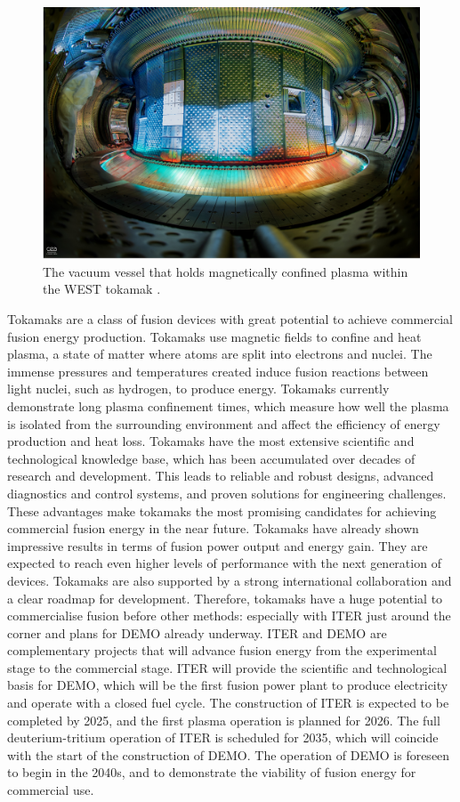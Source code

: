 \begin{figure}[H]
    \centering
    \includegraphics[width=\textwidth]{images/Final/vaccumeVessel.png}
    \caption{The vacuum vessel that holds magnetically confined plasma within the WEST tokamak \cite{vacves}.}
    \label{fig:vacves}
  \end{figure}

Tokamaks are a class of fusion devices with great potential to achieve commercial fusion energy production. Tokamaks use magnetic fields to confine and heat plasma, a state of matter where atoms are split into electrons and nuclei. The immense pressures and temperatures created induce fusion reactions between light nuclei, such as hydrogen, to produce energy. Tokamaks currently demonstrate long plasma confinement times, which measure how well the plasma is isolated from the surrounding environment and affect the efficiency of energy production and heat loss. Tokamaks have the most extensive scientific and technological knowledge base, which has been accumulated over decades of research and development. This leads to reliable and robust designs, advanced diagnostics and control systems, and proven solutions for engineering challenges. These advantages make tokamaks the most promising candidates for achieving commercial fusion energy in the near future. Tokamaks have already shown impressive results in terms of fusion power output and energy gain. They are expected to reach even higher levels of performance with the next generation of devices. Tokamaks are also supported by a strong international collaboration and a clear roadmap for development. Therefore, tokamaks have a huge potential to commercialise fusion before other methods: especially with ITER just around the corner and plans for DEMO already underway. ITER and DEMO are complementary projects that will advance fusion energy from the experimental stage to the commercial stage. ITER will provide the scientific and technological basis for DEMO, which will be the first fusion power plant to produce electricity and operate with a closed fuel cycle. The construction of ITER is expected to be completed by 2025, and the first plasma operation is planned for 2026. The full deuterium-tritium operation of ITER is scheduled for 2035, which will coincide with the start of the construction of DEMO. The operation of DEMO is foreseen to begin in the 2040s, and to demonstrate the viability of fusion energy for commercial use.

